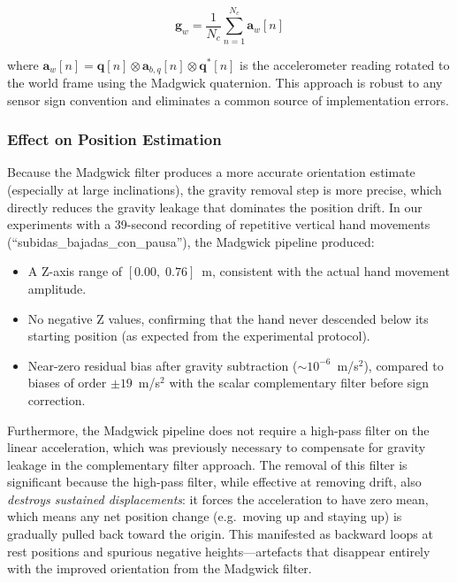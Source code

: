 \begin{equation}
  \mathbf{g}_w = \frac{1}{N_c} \sum_{n=1}^{N_c}
    \mathbf{a}_w[n]
  \label{eq:g_world_measured}
\end{equation}

\noindent where $\mathbf{a}_w[n] = \mathbf{q}[n] \otimes
\mathbf{a}_{b,q}[n] \otimes \mathbf{q}^*[n]$ is the accelerometer reading
rotated to the world frame using the Madgwick quaternion.  This approach is
robust to any sensor sign convention and eliminates a common source of
implementation errors.

\subsubsection{Effect on Position Estimation}

Because the Madgwick filter produces a more accurate orientation estimate
(especially at large inclinations), the gravity removal step is more
precise, which directly reduces the gravity leakage that dominates the
position drift.  In our experiments with a 39-second recording of repetitive
vertical hand movements (``subidas\_bajadas\_con\_pausa''), the Madgwick
pipeline produced:

\begin{itemize}
  \item A Z-axis range of $[0.00,\; 0.76]$~m, consistent with the actual
        hand movement amplitude.
  \item No negative Z values, confirming that the hand never descended below
        its starting position (as expected from the experimental protocol).
  \item Near-zero residual bias after gravity subtraction
        ($\sim 10^{-6}$~m/s$^2$), compared to biases of order $\pm 19$~m/s$^2$
        with the scalar complementary filter before sign correction.
\end{itemize}

\noindent Furthermore, the Madgwick pipeline does not require a high-pass
filter on the linear acceleration, which was previously necessary to
compensate for gravity leakage in the complementary filter approach.  The
removal of this filter is significant because the high-pass filter, while
effective at removing drift, also \emph{destroys sustained displacements}:
it forces the acceleration to have zero mean, which means any net position
change (e.g.\ moving up and staying up) is gradually pulled back toward the
origin.  This manifested as backward loops at rest positions and spurious
negative heights---artefacts that disappear entirely with the improved
orientation from the Madgwick filter.
